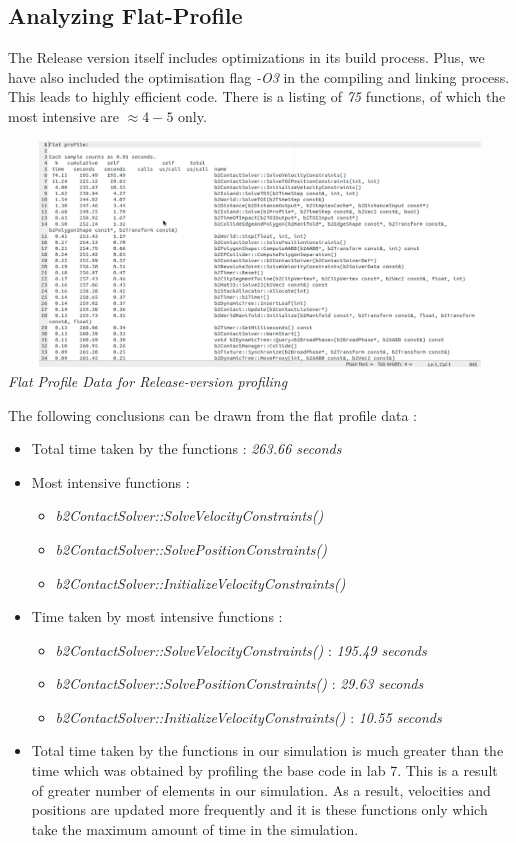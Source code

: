 \documentclass[a4paper,11pt]{article}
\begin{document}
\subsection{Analyzing Flat-Profile}

The Release version itself includes optimizations in its build process. Plus, we have also included the optimisation flag \emph{-O3} in the compiling and linking process. This leads to highly efficient code. There is a listing of \emph{75} functions, of which the most intensive are $\approx 4-5$ only. 

\begin{center}
\includegraphics[width=180mm, height=60mm]{profile_data.eps}\\
\emph{Flat Profile Data for Release-version profiling}
\end{center}

The following conclusions can be drawn from the flat profile data :

\begin{itemize}

\item Total time taken by the functions : \emph{263.66 seconds}
\item Most intensive functions : 
\begin{itemize}
\item \emph{b2ContactSolver::SolveVelocityConstraints()}
\item \emph{b2ContactSolver::SolvePositionConstraints()}
\item \emph{b2ContactSolver::InitializeVelocityConstraints()}
\end{itemize}
\item Time taken by most intensive functions : 
\begin{itemize}
\item \emph{b2ContactSolver::SolveVelocityConstraints()} : \emph{195.49 seconds}
\item \emph{b2ContactSolver::SolvePositionConstraints()} : \emph{29.63 seconds}
\item \emph{b2ContactSolver::InitializeVelocityConstraints()} : \emph{10.55 seconds}
\end{itemize}
\item Total time taken by the functions in our simulation is much greater than the time which was obtained by profiling the base code in lab 7. This is a result of greater number of elements in our simulation. As a result, velocities and positions are updated more frequently and it is these functions only which take the maximum amount of time in the simulation. 
\end{itemize}
\end{document}
